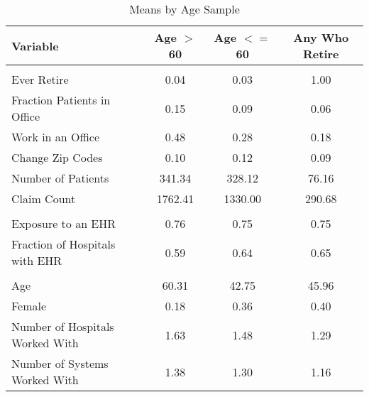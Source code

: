 \begin{table}[ht]

\caption{Means by Age Sample}
\centering
\begin{tabular}[t]{lccc}
\toprule
Variable & Age $>$ 60 & Age $<=$ 60 & Any Who Retire\\
\midrule
\addlinespace[0.3em]
\multicolumn{4}{l}{\textbf{Outcomes}}\\
\hspace{1em}Ever Retire & 0.04 & 0.03 & 1.00\\
\hspace{1em}Fraction Patients in Office & 0.15 & 0.09 & 0.06\\
\hspace{1em}Work in an Office & 0.48 & 0.28 & 0.18\\
\hspace{1em}Change Zip Codes & 0.10 & 0.12 & 0.09\\
\hspace{1em}Number of Patients & 341.34 & 328.12 & 76.16\\
\hspace{1em}Claim Count & 1762.41 & 1330.00 & 290.68\\
\addlinespace[0.3em]
\multicolumn{4}{l}{\textbf{Treatment}}\\
\hspace{1em}Exposure to an EHR & 0.76 & 0.75 & 0.75\\
\hspace{1em}Fraction of Hospitals with EHR & 0.59 & 0.64 & 0.65\\
\addlinespace[0.3em]
\multicolumn{4}{l}{\textbf{Characteristics}}\\
\hspace{1em}Age & 60.31 & 42.75 & 45.96\\
\hspace{1em}Female & 0.18 & 0.36 & 0.40\\
\hspace{1em}Number of Hospitals Worked With & 1.63 & 1.48 & 1.29\\
\hspace{1em}Number of Systems Worked With & 1.38 & 1.30 & 1.16\\
\bottomrule
\end{tabular}
\label{tab:splitstats}
\end{table}
